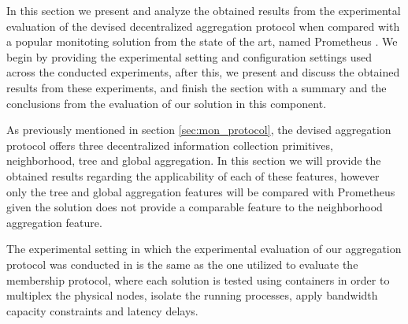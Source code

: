 

In this section we present and analyze the obtained results from the experimental evaluation of the devised decentralized aggregation protocol when compared with a popular monitoting solution from the state of the art, named Prometheus . We begin by providing the experimental setting and configuration settings used across the conducted experiments, after this, we present and discuss the obtained results from these experiments, and finish the section with a summary and the conclusions from the evaluation of our solution in this component.

As previously mentioned in section \ref{sec:mon_protocol}, the devised aggregation protocol offers three decentralized information collection primitives, neighborhood, tree and global aggregation. In this section we will provide the obtained results regarding the applicability of each of these features, however only the tree and global aggregation features will be compared with Prometheus given the solution does not provide a comparable feature to the neighborhood aggregation feature.

The experimental setting in which the experimental evaluation of our aggregation protocol was conducted in is the same as the one utilized to evaluate the membership protocol, where each solution is tested using containers in order to multiplex the physical nodes, isolate the running processes, apply bandwidth capacity constraints and latency delays.





